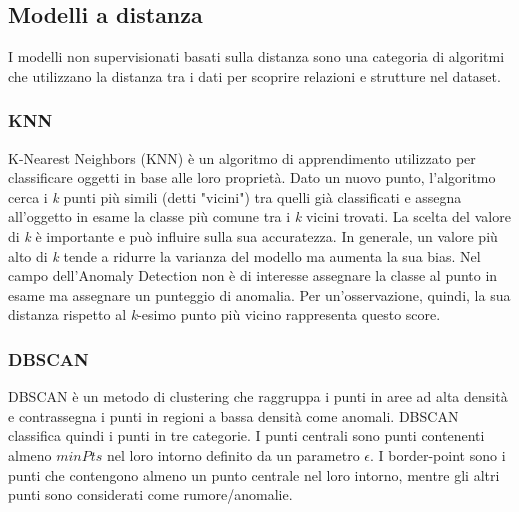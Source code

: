 \subsection{Modelli a distanza}
I modelli non supervisionati basati sulla distanza sono una categoria di algoritmi che utilizzano la distanza tra i dati per scoprire relazioni e strutture nel dataset.

\subsubsection{KNN}
K-Nearest Neighbors (KNN) \cite{ramaswamy2000efficient,angiulli2002fast} è un algoritmo di apprendimento utilizzato per classificare oggetti in base alle loro proprietà. Dato un nuovo punto, l'algoritmo cerca i \textit{k} punti più simili (detti "vicini") tra quelli già classificati e assegna all'oggetto in esame la classe più comune tra i \textit{k} vicini trovati. La scelta del valore di \textit{k} è importante e può influire sulla sua accuratezza. In generale, un valore più alto di \textit{k} tende a ridurre la varianza del modello ma aumenta la sua bias.
Nel campo dell'Anomaly Detection non è di interesse assegnare la classe al punto in esame ma assegnare un punteggio di anomalia. Per un'osservazione, quindi, la sua distanza rispetto al \textit{k}-esimo punto più vicino rappresenta questo score.

\subsubsection{DBSCAN}
DBSCAN è un metodo di clustering che raggruppa i punti in aree ad alta densità e contrassegna i punti in regioni a bassa densità come anomali.
DBSCAN classifica quindi i punti in tre categorie. I punti centrali sono punti
contenenti almeno $minPts$ nel loro intorno definito da un parametro $\epsilon$. I border-point sono i punti che contengono almeno un punto centrale nel loro intorno, mentre gli altri punti sono considerati come rumore/anomalie. 

